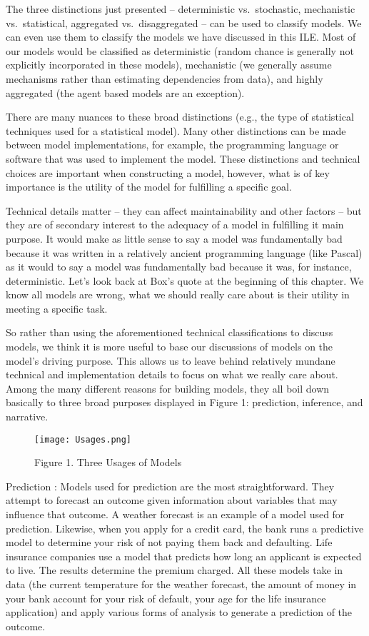 \documentclass[]{memoir}
\let\Oldincludegraphics\includegraphics
\renewcommand{\includegraphics}[1]{\Oldincludegraphics[max size={\textwidth}{\textheight}]{#1}}
\begin{document}
The three distinctions just presented -- deterministic vs.~stochastic,
mechanistic vs.~statistical, aggregated vs.~disaggregated -- can be used
to classify models. We can even use them to classify the models we have
discussed in this ILE. Most of our models would be classified as
deterministic (random chance is generally not explicitly incorporated in
these models), mechanistic (we generally assume mechanisms rather than
estimating dependencies from data), and highly aggregated (the agent
based models are an exception).

There are many nuances to these broad distinctions (e.g., the type of
statistical techniques used for a statistical model). Many other
distinctions can be made between model implementations, for example, the
programming language or software that was used to implement the model.
These distinctions and technical choices are important when constructing
a model, however, what is of key importance is the utility of the model
for fulfilling a specific goal.

Technical details matter -- they can affect maintainability and other
factors -- but they are of secondary interest to the adequacy of a model
in fulfilling it main purpose. It would make as little sense to say a
model was fundamentally bad because it was written in a relatively
ancient programming language (like Pascal) as it would to say a model
was fundamentally bad because it was, for instance, deterministic. Let's
look back at Box's quote at the beginning of this chapter. We know all
models are wrong, what we should really care about is their utility in
meeting a specific task.

So rather than using the aforementioned technical classifications to
discuss models, we think it is more useful to base our discussions of
models on the model's driving purpose. This allows us to leave behind
relatively mundane technical and implementation details to focus on what
we really care about. Among the many different reasons for building
models, they all boil down basically to three broad purposes displayed
in Figure 1: prediction, inference, and narrative.

\begin{figure}[htbp]
\centering
\texttt{[image: Usages.png]}
\caption{Figure 1. Three Usages of Models}
\end{figure}

Prediction : Models used for prediction are the most straightforward.
They attempt to forecast an outcome given information about variables
that may influence that outcome. A weather forecast is an example of a
model used for prediction. Likewise, when you apply for a credit card,
the bank runs a predictive model to determine your risk of not paying
them back and defaulting. Life insurance companies use a model that
predicts how long an applicant is expected to live. The results
determine the premium charged. All these models take in data (the
current temperature for the weather forecast, the amount of money in
your bank account for your risk of default, your age for the life
insurance application) and apply various forms of analysis to generate a
prediction of the outcome.
\end{document}
